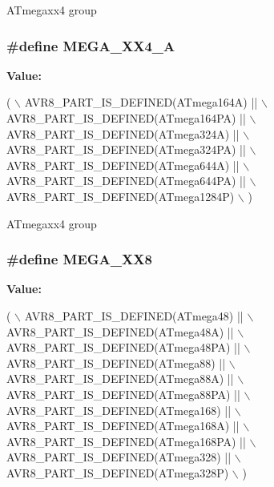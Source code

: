 A\-Tmegaxx4 group \hypertarget{group__mega__part__macros__group_gaf7dde20cbd5a8e5d53438e8dfac074a2}{
\subsubsection[{M\-E\-G\-A\-\_\-\-X\-X4\-\_\-\-A}]{\setlength{\rightskip}{0pt plus 5cm}\#define M\-E\-G\-A\-\_\-\-X\-X4\-\_\-\-A}}\label{group__mega__part__macros__group_gaf7dde20cbd5a8e5d53438e8dfac074a2}
{\bfseries Value\-:}
\begin{DoxyCode}
( \(\backslash\)
                AVR8\_PART\_IS\_DEFINED(ATmega164A)  || \(\backslash\)
                AVR8\_PART\_IS\_DEFINED(ATmega164PA) || \(\backslash\)
                AVR8\_PART\_IS\_DEFINED(ATmega324A)  || \(\backslash\)
                AVR8\_PART\_IS\_DEFINED(ATmega324PA) || \(\backslash\)
                AVR8\_PART\_IS\_DEFINED(ATmega644A)  || \(\backslash\)
                AVR8\_PART\_IS\_DEFINED(ATmega644PA) || \(\backslash\)
                AVR8\_PART\_IS\_DEFINED(ATmega1284P) \(\backslash\)
                )
\end{DoxyCode}
A\-Tmegaxx4 group \hypertarget{group__mega__part__macros__group_ga47583caa82990781cd23a8495710ef31}{
\subsubsection[{M\-E\-G\-A\-\_\-\-X\-X8}]{\setlength{\rightskip}{0pt plus 5cm}\#define M\-E\-G\-A\-\_\-\-X\-X8}}\label{group__mega__part__macros__group_ga47583caa82990781cd23a8495710ef31}
{\bfseries Value\-:}
\begin{DoxyCode}
( \(\backslash\)
                AVR8\_PART\_IS\_DEFINED(ATmega48)    || \(\backslash\)
                AVR8\_PART\_IS\_DEFINED(ATmega48A)   || \(\backslash\)
                AVR8\_PART\_IS\_DEFINED(ATmega48PA)  || \(\backslash\)
                AVR8\_PART\_IS\_DEFINED(ATmega88)    || \(\backslash\)
                AVR8\_PART\_IS\_DEFINED(ATmega88A)   || \(\backslash\)
                AVR8\_PART\_IS\_DEFINED(ATmega88PA)  || \(\backslash\)
                AVR8\_PART\_IS\_DEFINED(ATmega168)   || \(\backslash\)
                AVR8\_PART\_IS\_DEFINED(ATmega168A)  || \(\backslash\)
                AVR8\_PART\_IS\_DEFINED(ATmega168PA) || \(\backslash\)
                AVR8\_PART\_IS\_DEFINED(ATmega328)   || \(\backslash\)
                AVR8\_PART\_IS\_DEFINED(ATmega328P) \(\backslash\)
                )
\end{DoxyCode}
